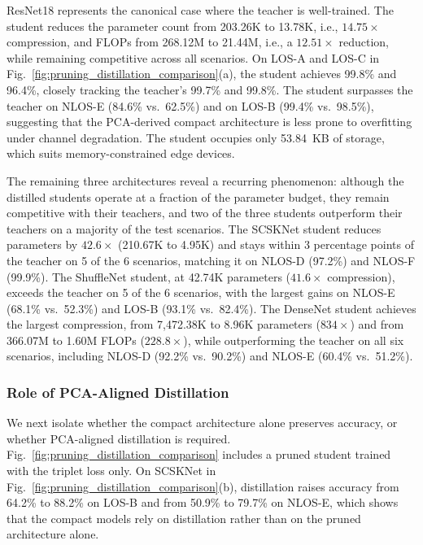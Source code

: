 \documentclass[journal,comsoc]{IEEEtran}
\begin{document}
ResNet18 represents the canonical case where the teacher is well-trained.
The student reduces the parameter count from 203.26K to 13.78K, i.e., $14.75\times$ compression, and FLOPs from 268.12M to 21.44M, i.e., a $12.51\times$ reduction, while remaining competitive across all scenarios.
On LOS-A and LOS-C in Fig.~\ref{fig:pruning_distillation_comparison}(a), the student achieves 99.8\% and 96.4\%, closely tracking the teacher's 99.7\% and 99.8\%.
The student surpasses the teacher on NLOS-E (84.6\% vs.\ 62.5\%) and on LOS-B (99.4\% vs.\ 98.5\%), suggesting that the PCA-derived compact architecture is less prone to overfitting under channel degradation.
The student occupies only 53.84~KB of storage, which suits memory-constrained edge devices.

The remaining three architectures reveal a recurring phenomenon: although the distilled students operate at a fraction of the parameter budget, they remain competitive with their teachers, and two of the three students outperform their teachers on a majority of the test scenarios.
The SCSKNet student reduces parameters by $42.6\times$ (210.67K to 4.95K) and stays within 3 percentage points of the teacher on 5 of the 6 scenarios, matching it on NLOS-D (97.2\%) and NLOS-F (99.9\%).
The ShuffleNet student, at 42.74K parameters ($41.6\times$ compression), exceeds the teacher on 5 of the 6 scenarios, with the largest gains on NLOS-E (68.1\% vs.\ 52.3\%) and LOS-B (93.1\% vs.\ 82.4\%).
The DenseNet student achieves the largest compression, from 7,472.38K to 8.96K parameters ($834\times$) and from 366.07M to 1.60M FLOPs ($228.8\times$), while outperforming the teacher on all six scenarios, including NLOS-D (92.2\% vs.\ 90.2\%) and NLOS-E (60.4\% vs.\ 51.2\%).

\subsubsection{Role of PCA-Aligned Distillation}
\label{subsubsec:distillation_role}

We next isolate whether the compact architecture alone preserves accuracy, or whether PCA-aligned distillation is required.
Fig.~\ref{fig:pruning_distillation_comparison} includes a pruned student trained with the triplet loss only.
On SCSKNet in Fig.~\ref{fig:pruning_distillation_comparison}(b), distillation raises accuracy from 64.2\% to 88.2\% on LOS-B and from 50.9\% to 79.7\% on NLOS-E, which shows that the compact models rely on distillation rather than on the pruned architecture alone.
\end{document}
